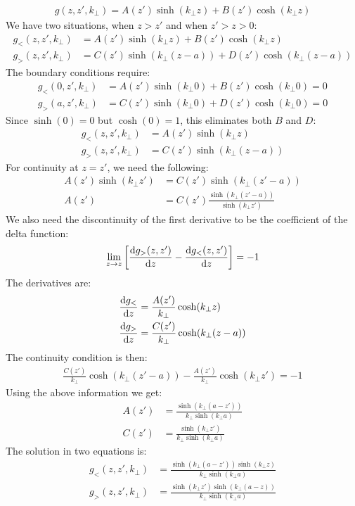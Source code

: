 \documentclass[12pt]{article}
\begin{document}
\begin{align*}
  g(z,z',k_\perp)=A(z')\sinh(k_\perp z)+B(z')\cosh(k_\perp z)
\end{align*}
We have two situations, when $z>z'$ and when $z'>z>0$:
\begin{align*}
  g_<(z,z',k_\perp)&=A(z')\sinh(k_\perp z)+B(z')\cosh(k_\perp z)\\
  g_>(z,z',k_\perp)&=C(z')\sinh(k_\perp (z-a))+D(z')\cosh(k_\perp (z-a))
\end{align*}
The boundary conditions require:
\begin{align*}
  g_<(0,z',k_\perp)&=A(z')\sinh(k_\perp 0)+B(z')\cosh(k_\perp 0)=0\\
  g_>(a,z',k_\perp)&=C(z')\sinh(k_\perp 0)+D(z')\cosh(k_\perp 0)=0
\end{align*}
Since $\sinh(0)=0$ but $\cosh(0)=1$, this eliminates both $B$ and $D$:
\begin{align*}
  g_<(z,z',k_\perp)&=A(z')\sinh(k_\perp z)\\
  g_>(z,z',k_\perp)&=C(z')\sinh(k_\perp (z-a))
\end{align*}
For continuity at $z=z'$, we need the following:
\begin{align*}
  A(z')\sinh(k_\perp z')&=C(z')\sinh(k_\perp(z'-a))\\
  A(z')&=C(z')\frac{\sinh(k_\perp(z'-a))}{\sinh(k_\perp z')}
\end{align*}
We also need the discontinuity of the first derivative to be the coefficient of the delta function:
\begin{align*}
  \lim_{z\to z}\qty[\dv{g_>(z,z')}{z}-\dv{g_<(z,z')}{z}]=-1
\end{align*}
The derivatives are:
\begin{align*}
  \dv{g_<}{z}&=\frac{A(z')}{k_\perp}\cosh(k_\perp z)\\
  \dv{g_>}{z}&=\frac{C(z')}{k_\perp}\cosh(k_\perp(z-a))
\end{align*}
The continuity condition is then:
\begin{align*}
  \frac{C(z')}{k_\perp}\cosh(k_\perp(z'-a))
  -\frac{A(z')}{k_\perp}\cosh(k_\perp z')=-1
\end{align*}
Using the above information we get:
\begin{align*}
  A(z')&=\frac{\sinh(k_\perp (a-z'))}{k_\perp\sinh(k_\perp a)}\\
  C(z')&=\frac{\sinh(k_\perp z')}{k_\perp\sinh(k_\perp a)}
\end{align*}
The solution in two equations is:
\begin{align*}
  g_<(z,z',k_\perp)&=\frac{\sinh(k_\perp(a-z'))\sinh(k_\perp z)}
  {k_\perp\sinh(k_\perp a)}\\
  g_>(z,z',k_\perp)&=\frac{\sinh(k_\perp z')\sinh(k_\perp(a-z))}
  {k_\perp\sinh(k_\perp a)}
\end{align*}
\end{document}
